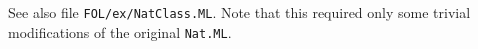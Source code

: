 \begin{ascbox}
\begin{ascbox}
\begin{ascbox}
\begin{ascbox}
\begin{ascbox}
\begin{ascbox}
\begin{ascbox}
\begin{ascbox}
\begin{ascbox}
\begin{ascbox}
\begin{ascbox}
\begin{ascbox}
\begin{ascbox}
See also file \texttt{FOL/ex/NatClass.ML}. Note that this required only
some trivial modifications of the original \texttt{Nat.ML}.















\end{ascbox}
\end{ascbox}
\end{ascbox}
\end{ascbox}
\end{ascbox}
\end{ascbox}
\end{ascbox}
\end{ascbox}
\end{ascbox}
\end{ascbox}
\end{ascbox}
\end{ascbox}
\end{ascbox}
